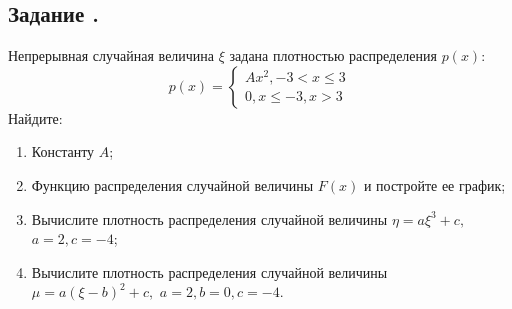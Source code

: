 \documentclass[12pt]{article}
\begin{document}
\subsection{Задание .}
Непрерывная случайная величина $\xi$ задана плотностью распределения $p(x)$:
\[
	p(x) =
	\begin{cases}
		Ax^2, -3 < x \leq 3 \\
		0, x \leq -3, x > 3
	\end{cases}
\]
Найдите:
\begin{enumerate}
	\item Константу $A$;
	\item Функцию распределения случайной величины $F(x)$ и постройте ее график;
	\item Вычислите плотность распределения случайной величины $\eta = a\xi^3 + c,$ $a = 2, c = -4$;
	\item Вычислите плотность распределения случайной величины $\mu = a(\xi - b)^2 + c,$ $a = 2, b = 0, c = -4$.
\end{enumerate}
\end{document}
